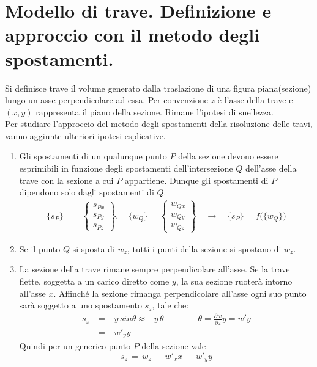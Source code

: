 \section{Modello di trave. Definizione e approccio con il metodo degli spostamenti.}

Si definisce trave il volume generato dalla traslazione di una figura piana(sezione) lungo un asse perpendicolare ad essa. Per convenzione $z$ è l'asse della trave e $(x,y)$ rappresenta il piano della sezione. Rimane l'ipotesi di snellezza.\\

Per studiare l'approccio del metodo degli spostamenti della risoluzione delle travi, vanno aggiunte ulteriori ipotesi esplicative.
\begin{enumerate}
    \item Gli spostamenti di un qualunque punto $P$ della sezione devono essere esprimibili in funzione degli spostamenti dell'intersezione $Q$ dell'asse della trave con la sezione a cui $P$ appartiene. Dunque gli spostamenti di $P$ dipendono solo dagli spostamenti di $Q$.
    \begin{align*}
    \{s_P\} &= \begin{Bmatrix} s_{Px} \\ s_{Py} \\ s_{Pz} \end{Bmatrix}, \quad
    \{w_Q\} = \begin{Bmatrix} w_{Qx} \\ w_{Qy} \\ w_{Qz}  \end{Bmatrix}
    \quad \rightarrow \quad
    \{s_P\} = f\big( \{w_Q\} \big)
\end{align*}
    \item Se il punto $Q$ si sposta di $w_{z}$, tutti i punti della sezione si spostano di $w_{z}$.
    \item La sezione della trave rimane sempre perpendicolare all'asse. Se la trave flette, soggetta a un carico diretto come $y$, la sua sezione ruoterà intorno all'asse $x$. Affinché la sezione rimanga perpendicolare all'asse ogni suo punto sarà soggetto a uno spostamento $s_z$, tale che:
    \begin{align*}
        s_z &= -y\, sin\theta \approx -y \,\theta    \quad \quad \quad \quad \theta = \frac{\partial w}{\partial z}y = w' y\\
        &= -w'_y  y
    \end{align*}
    Quindi per un generico punto $P$ della sezione vale
    \begin{equation*}
        s_z \,=\,  w_z \,-\,w'_x  x\, -\,w'_y  y
    \end{equation*}


\end{enumerate}



